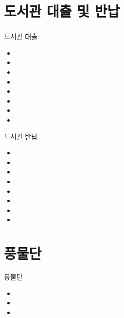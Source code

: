 \documentclass[aspectratio=1610,20pt,xcolor=pdftex,dvipsnames,table,handout]{beamer}
\begin{document}
		\section{도서관 대출 및 반납}
		\begin{frame} [t,plain]
		\frametitle{}

			\begin{block} {도서관 대출 }
			\setlength{\leftmargini}{1em}			
			\begin{itemize}
				\item 
				\item 
				\item 
				\item 
				\item 
				\item 
				\item 
				\item 
			\end{itemize}
			\end{block}						

			\begin{block} {도서관 반납 }
			\setlength{\leftmargini}{1em}			
			\begin{itemize}
				\item 
				\item 
				\item 
				\item 
				\item 
				\item 
				\item 
				\item 
			\end{itemize}
			\end{block}						

		\end{frame}					


		\section{풍물단}
		\begin{frame} [t,plain]
			\begin{block} {풍물단}
			\setlength{\leftmargini}{1em}			
			\begin{itemize}
				\item 	\hrulefill
				\item 	\hrulefill
				\item 	\hrulefill
			\end{itemize}
			\end{block}						
		\end{frame}					
\end{document}
